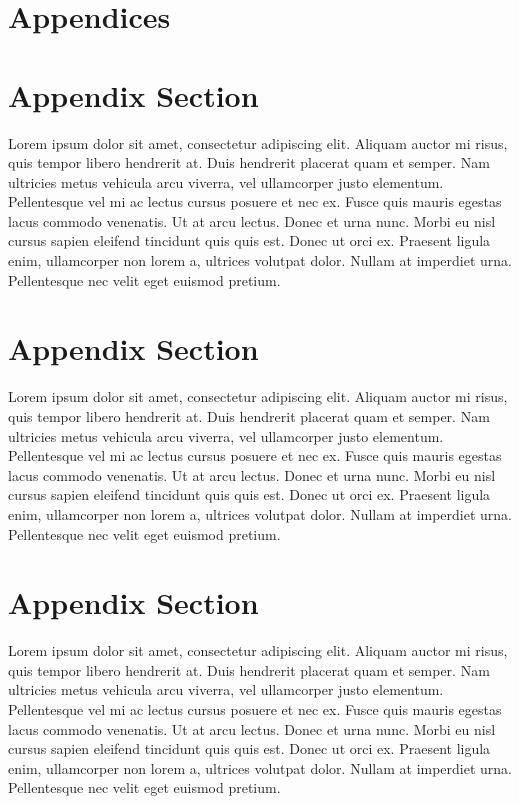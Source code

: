\documentclass[
	a4paper, %
	12pt, %
]{include/CSSullivanBusinessReport}
\begin{document}

\newpage

\section*{Appendices}

\begin{appendices}

\section{Appendix Section}

Lorem ipsum dolor sit amet, consectetur adipiscing elit. Aliquam auctor mi risus, quis tempor libero hendrerit at. Duis hendrerit placerat quam et semper. Nam ultricies metus vehicula arcu viverra, vel ullamcorper justo elementum. Pellentesque vel mi ac lectus cursus posuere et nec ex. Fusce quis mauris egestas lacus commodo venenatis. Ut at arcu lectus. Donec et urna nunc. Morbi eu nisl cursus sapien eleifend tincidunt quis quis est. Donec ut orci ex. Praesent ligula enim, ullamcorper non lorem a, ultrices volutpat dolor. Nullam at imperdiet urna. Pellentesque nec velit eget euismod pretium.

\section{Appendix Section}

Lorem ipsum dolor sit amet, consectetur adipiscing elit. Aliquam auctor mi risus, quis tempor libero hendrerit at. Duis hendrerit placerat quam et semper. Nam ultricies metus vehicula arcu viverra, vel ullamcorper justo elementum. Pellentesque vel mi ac lectus cursus posuere et nec ex. Fusce quis mauris egestas lacus commodo venenatis. Ut at arcu lectus. Donec et urna nunc. Morbi eu nisl cursus sapien eleifend tincidunt quis quis est. Donec ut orci ex. Praesent ligula enim, ullamcorper non lorem a, ultrices volutpat dolor. Nullam at imperdiet urna. Pellentesque nec velit eget euismod pretium.

\section{Appendix Section}

Lorem ipsum dolor sit amet, consectetur adipiscing elit. Aliquam auctor mi risus, quis tempor libero hendrerit at. Duis hendrerit placerat quam et semper. Nam ultricies metus vehicula arcu viverra, vel ullamcorper justo elementum. Pellentesque vel mi ac lectus cursus posuere et nec ex. Fusce quis mauris egestas lacus commodo venenatis. Ut at arcu lectus. Donec et urna nunc. Morbi eu nisl cursus sapien eleifend tincidunt quis quis est. Donec ut orci ex. Praesent ligula enim, ullamcorper non lorem a, ultrices volutpat dolor. Nullam at imperdiet urna. Pellentesque nec velit eget euismod pretium.

\end{appendices}

\end{document}
